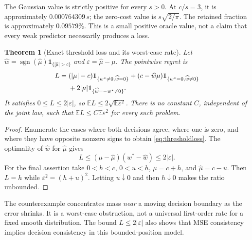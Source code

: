 \documentclass[11pt]{article}
\theoremstyle{plain}
\newtheorem{theorem}{Theorem}[section]
\theoremstyle{definition}
\theoremstyle{remark}
\newcommand{\E}{\mathbb E}
\DeclareMathOperator{\sgn}{sgn}
\begin{document}
The Gaussian value is strictly positive for every \(s>0\).
At \(c/s=3\), it is approximately \(0.000764309\,s\);
the zero-cost value is \(s\sqrt{2/\pi}\). The retained fraction is
approximately \(0.09579\%\). This is a small positive oracle value,
not a claim that every weak predictor necessarily produces a loss.

\begin{theorem}[Exact threshold loss and its worst-case rate]\label{thm:thresholdloss}
Let
\(\widehat w=\sgn(\widehat\mu)\mathbf1_{\{|\widehat\mu|>c\}}\)
and \(\varepsilon=\widehat\mu-\mu\).
The pointwise regret is
\begin{align}
L={}&(|\mu|-c)\mathbf1_{\{w^\ast\ne0,\widehat w=0\}}
 +(c-\widehat w\mu)\mathbf1_{\{w^\ast=0,\widehat w\ne0\}}\notag\\
&+2|\mu|\mathbf1_{\{\widehat w=-w^\ast\ne0\}}.
\label{eq:thresholdloss}
\end{align}
It satisfies \(0\le L\le2|\varepsilon|\), so
\(\E L\le2\sqrt{\E\varepsilon^2}\).
There is no constant \(C\), independent of the joint law, such that
\(\E L\le C\E\varepsilon^2\) for every such problem.
\end{theorem}
\begin{proof}
Enumerate the cases where both decisions agree, where one is zero,
and where they have opposite nonzero signs to obtain
\eqref{eq:thresholdloss}. The optimality of \(\widehat w\) for
\(\widehat\mu\) gives
\[
L\le(\mu-\widehat\mu)(w^\ast-\widehat w)\le2|\varepsilon|.
\]
For the final assertion take \(0<h<c\), \(0<u<h\),
\(\mu=c+h\), and \(\widehat\mu=c-u\).
Then \(L=h\) while \(\varepsilon^2=(h+u)^2\).
Letting \(u\downarrow0\) and then \(h\downarrow0\) makes the ratio
unbounded.
\end{proof}

The counterexample concentrates mass \emph{near} a moving decision
boundary as the error shrinks. It is a worst-case obstruction, not a
universal first-order rate for a fixed smooth distribution. The
bound \(L\le2|\varepsilon|\) also shows that MSE consistency implies
decision consistency in this bounded-position model.
\end{document}
